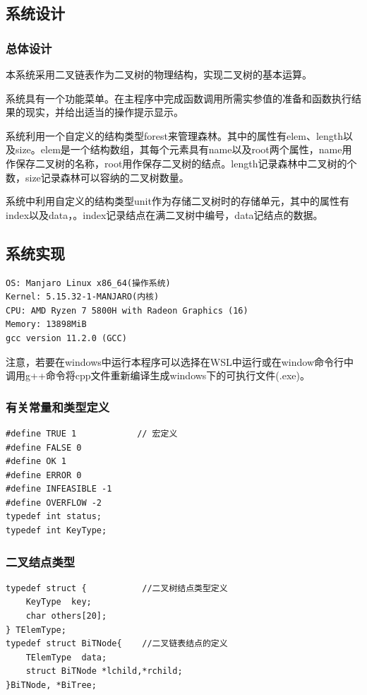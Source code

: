 \documentclass[supercite]{Experimental_Report}
\theoremstyle{definition}
\begin{document}
\subsection{系统设计}
\subsubsection{总体设计}
本系统采用二叉链表作为二叉树的物理结构，实现二叉树的基本运算。

系统具有一个功能菜单。在主程序中完成函数调用所需实参值的准备和函数执行结果的现实，并给出适当的操作提示显示。

系统利用一个自定义的结构类型forest来管理森林。其中的属性有elem、length以及size。elem是一个结构数组，其每个元素具有name以及root两个属性，name用作保存二叉树的名称，root用作保存二叉树的结点。length记录森林中二叉树的个数，size记录森林可以容纳的二叉树数量。

系统中利用自定义的结构类型unit作为存储二叉树时的存储单元，其中的属性有index以及data，。index记录结点在满二叉树中编号，data记结点的数据。

\subsection{系统实现}
\begin{verbatim}
OS: Manjaro Linux x86_64(操作系统) 
Kernel: 5.15.32-1-MANJARO(内核)
CPU: AMD Ryzen 7 5800H with Radeon Graphics (16) 
Memory: 13898MiB
gcc version 11.2.0 (GCC)
\end{verbatim}
注意，若要在windows中运行本程序可以选择在WSL中运行或在window命令行中调用g++命令将cpp文件重新编译生成windows下的可执行文件(.exe)。

\subsubsection{有关常量和类型定义}
\begin{verbatim}
#define TRUE 1            // 宏定义
#define FALSE 0
#define OK 1
#define ERROR 0
#define INFEASIBLE -1
#define OVERFLOW -2
typedef int status;
typedef int KeyType;
\end{verbatim}

\subsubsection{二叉结点类型}
\begin{verbatim}
typedef struct {		   //二叉树结点类型定义
    KeyType  key;
    char others[20];
} TElemType;               
typedef struct BiTNode{    //二叉链表结点的定义
    TElemType  data;
	struct BiTNode *lchild,*rchild;
}BiTNode, *BiTree;
\end{verbatim}
\end{document}
